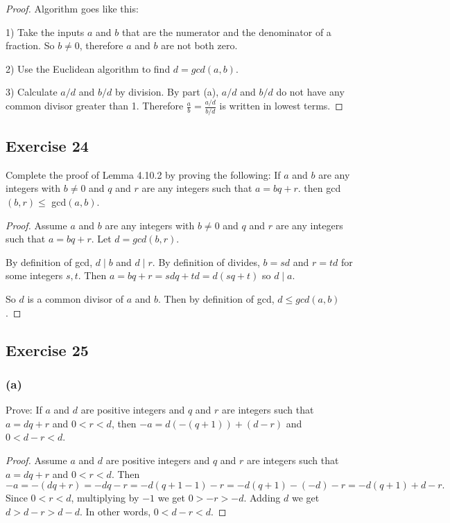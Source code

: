 \documentclass[14pt]{extarticle}
\newcommand{\dps}{\displaystyle}
\begin{document}
\begin{proof}
Algorithm goes like this:

1) Take the inputs $a$ and $b$ that are the numerator and the denominator of a fraction. So $b \neq 0$, therefore $a$ and $b$ are not both zero.

2) Use the Euclidean algorithm to find $d = gcd(a,b)$.

3) Calculate $a/d$ and $b/d$ by division. By part (a), $a/d$ and $b/d$ do not have any common divisor greater than 1. Therefore $\dps\frac{a}{b} = \frac{a/d}{b/d}$ is written in lowest terms.
\end{proof}

\subsection{Exercise 24}
Complete the proof of Lemma 4.10.2 by proving the following: If $a$ and $b$ are any integers with $b \neq 0$ and $q$ and $r$ are any integers such that $a = bq + r$.
then gcd$(b, r) \leq$ gcd$(a, b)$.

\begin{proof}
Assume $a$ and $b$ are any integers with $b \neq 0$ and $q$ and $r$ are any integers such that $a = bq + r$. Let $d = gcd(b,r)$.

By definition of gcd, $d \mid b$ and $d \mid r$. By definition of divides, $b = sd$ and $r = td$ for some integers $s, t$. Then $a = bq+r = sdq + td = d(sq + t)$ so $d \mid a$. 

So $d$ is a common divisor of $a$ and $b$. Then by definition of gcd, $d \leq gcd(a,b)$.
\end{proof}

\subsection{Exercise 25}
\subsubsection{(a)}
Prove: If $a$ and $d$ are positive integers and $q$ and $r$ are integers such that $a = dq + r$ and $0 < r < d$, then
$-a = d(-(q + 1)) + (d - r)$ and $0 < d - r < d$.

\begin{proof}
Assume $a$ and $d$ are positive integers and $q$ and $r$ are integers such that $a = dq + r$ and $0 < r < d$. Then
\[
-a = -(dq+r) = -dq-r = -d(q+1-1)-r = -d(q+1) -(-d) - r = -d(q+1) + d - r.
\]
Since $0 < r < d$, multiplying by $-1$ we get $0 > -r > -d$. Adding $d$ we get $d > d-r > d-d$. In other words, $0 < d-r < d$.
\end{proof}
\end{document}

